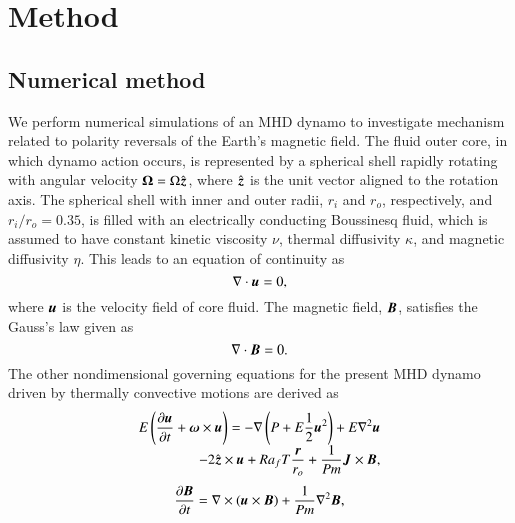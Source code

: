 \section{Method}
\label{section:method}

\subsection{Numerical method}

We perform numerical simulations of an MHD dynamo to investigate mechanism related to polarity reversals of the Earth's magnetic field.
The fluid outer core, in which dynamo action occurs, is represented by a spherical shell rapidly rotating with angular velocity $\mbox{\boldmath$\Omega$} = \Omega \hat{\mbox{\boldmath$z$}}$, where $\hat{\mbox{\boldmath$z$}}$ is the unit vector aligned to the rotation axis.
The spherical shell with inner and outer radii, $r_i$ and $r_o$, respectively, and $r_i / r_o = 0.35$, is filled with an electrically conducting Boussinesq fluid, which is assumed to have constant kinetic viscosity $\nu$, thermal diffusivity $\kappa$, and magnetic diffusivity $\eta$.
This leads to an equation of continuity as
%
\begin{equation}
\nabla \cdot \mbox{\boldmath$u$} = 0,
\label{eq:divu=0}
\end{equation}
%
where $\mbox{\boldmath$u$}$ is the velocity field of core fluid.
The magnetic field, $\mbox{\boldmath$B$}$, satisfies the Gauss's law given as
%
\begin{equation}
\nabla \cdot \mbox{\boldmath$B$} = 0.
\label{eq:divB=0}
\end{equation}
%
The other nondimensional governing equations for the present MHD dynamo driven by thermally convective motions are derived as
%
\begin{equation}
\begin{array}{l}
\displaystyle
E \left( \frac{\partial\bvec{u}}{\partial t} +
 \bvec{\omega} \times \bvec{u} \right) =
 - \nabla \left( P + E\frac{1}{2} \bvec{u}^2 \right)
 + E \nabla^2 \bvec{u}
\\
\displaystyle
\hspace*{\fill}
 -2 \hat{\bvec{z}} \times \bvec{u}
 + Ra_f T \frac{\bvec{r}}{r_o}
 + \frac{1}{Pm} \bvec{J} \times \bvec{B} ,
\end{array}
\label{eq:momentum}
\end{equation}
%
\begin{equation}
\frac{\partial \mbox{\boldmath$B$}}{\partial t} =
 \nabla \times (\mbox{\boldmath$u$} \times \mbox{\boldmath$B$} )
 + \frac{1}{Pm} \nabla^2 \mbox{\boldmath$B$} ,
\label{eq:induction}
\end{equation}
